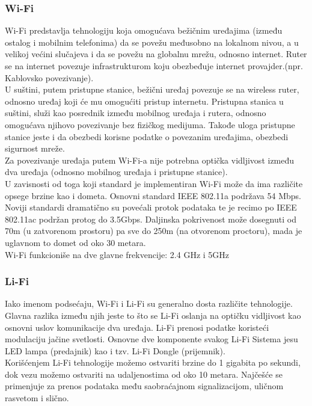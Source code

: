 \documentclass[a4paper]{article}
\begin{document}
        \subsubsection{Wi-Fi}
Wi-Fi predstavlja tehnologiju koja omogućava bežičnim uređajima (između ostalog i mobilnim telefonima) da se povežu međusobno na lokalnom nivou, a u velikoj većini slučajeva i da se povežu na globalnu mrežu, odnosno internet. Ruter se na internet povezuje infrastrukturom koju obezbeđuje internet provajder.(npr. Kablovsko povezivanje).\\
U suštini, putem pristupne stanice, bežični uređaj povezuje se na wireless ruter, odnosno uređaj koji će mu omogućiti pristup internetu. Pristupna stanica u suštini, služi kao posrednik između mobilnog uređaja i rutera, odnosno omogućava njihovo povezivanje bez fizičkog medijuma. Takođe uloga pristupne stanice jeste i da obezbedi korisne podatke o povezanim uređajima, obezbedi sigurnost mreže.\\
Za povezivanje uređaja putem Wi-Fi-a nije potrebna optička vidljivost između dva uređaja (odnosno mobilnog uređaja i pristupne stanice).\\
U zavisnosti od toga koji standard je implementiran Wi-Fi može da ima različite opsege brzine kao i dometa. Osnovni standard IEEE 802.11a podržava 54 Mbps. Noviji standardi dramatično su povećali protok podataka te je recimo po IEEE 802.11ac podržan protog do 3.5Gbps. Daljinska pokrivenost može dosegnuti od 70m (u zatvorenom prostoru) pa sve do 250m (na otvorenom proctoru), mada je uglavnom to domet od oko 30 metara. \cite{wireless} \\
Wi-Fi funkcioniše na dve glavne frekvencije: 2.4 GHz i 5GHz \\
        \subsubsection{Li-Fi}
Iako imenom podsećaju, Wi-Fi i Li-Fi su generalno dosta različite tehnologije.\\
Glavna razlika između njih jeste to što se Li-Fi oslanja na optičku vidljivost kao osnovni uslov komunikacije dva uređaja. Li-Fi prenosi podatke koristeći modulaciju jačine svetlosti. Osnovne dve komponente svakog Li-Fi Sistema jesu LED lampa (predajnik) kao i tzv. Li-Fi Dongle (prijemnik). \\
Korišćenjem Li-Fi tehnologije možemo ostvariti brzine do 1 gigabita po sekundi, dok vezu možemo ostvariti na udaljenostima od oko 10 metara.
Najčešće se primenjuje za prenos podataka među saobraćajnom signalizacijom, uličnom rasvetom i slično.\\
\end{document}

